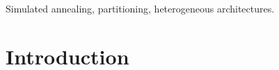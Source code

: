 \documentclass[10pt, conference, compsocconf]{IEEEtran}
\begin{document}
\begin{IEEEkeywords}
Simulated annealing, partitioning, heterogeneous architectures.

\end{IEEEkeywords}


%
\IEEEpeerreviewmaketitle



\section{Introduction}



\end{document}
